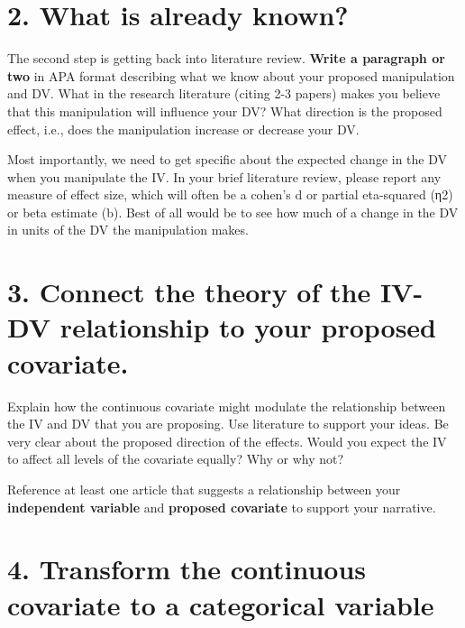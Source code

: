\documentclass[
]{book}
\begin{document}
\section*{2. What is already known?}\label{what-is-already-known}

The second step is getting back into literature review. \textbf{Write a paragraph or two} in APA format describing what we know about your proposed manipulation and DV. What in the research literature (citing 2-3 papers) makes you believe that this manipulation will influence your DV? What direction is the proposed effect, i.e., does the manipulation increase or decrease your DV.

Most importantly, we need to get specific about the expected change in the DV when you manipulate the IV. In your brief literature review, please report any measure of effect size, which will often be a cohen's d or partial eta-squared (η2) or beta estimate (b). Best of all would be to see how much of a change in the DV in units of the DV the manipulation makes.

\section*{3. Connect the theory of the IV-DV relationship to your proposed covariate.}\label{connect-the-theory-of-the-iv-dv-relationship-to-your-proposed-covariate.}

Explain how the continuous covariate might modulate the relationship between the IV and DV that you are proposing. Use literature to support your ideas. Be very clear about the proposed direction of the effects. Would you expect the IV to affect all levels of the covariate equally? Why or why not?

Reference at least one article that suggests a relationship between your \textbf{independent variable} and \textbf{proposed covariate} to support your narrative.

\section*{4. Transform the continuous covariate to a categorical variable}\label{transform-the-continuous-covariate-to-a-categorical-variable}
\end{document}
